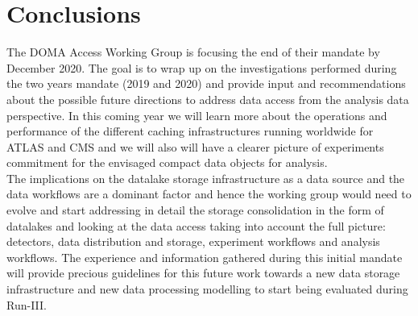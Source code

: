 \section{Conclusions}
The DOMA Access Working Group is focusing the end of their mandate by December 2020. The goal is to wrap up on the investigations performed during the two years mandate (2019 and 2020) and provide input and recommendations about the possible future directions to address data access from the analysis data perspective. In this coming year we will learn more about the operations and performance of the different caching infrastructures running worldwide for ATLAS and CMS and we will also will have a clearer picture of experiments commitment for the envisaged compact data objects for analysis.\\
The implications on the datalake storage infrastructure as a data source and the data workflows are a dominant factor and hence the working group would need to evolve and start addressing in detail the storage consolidation in the form of datalakes and looking at the data access taking into account the full picture: detectors, data distribution and storage, experiment workflows and analysis workflows. The experience and information gathered during this initial mandate will provide precious guidelines for this future work towards a new data storage infrastructure and new data processing modelling to start being evaluated during Run-III.
